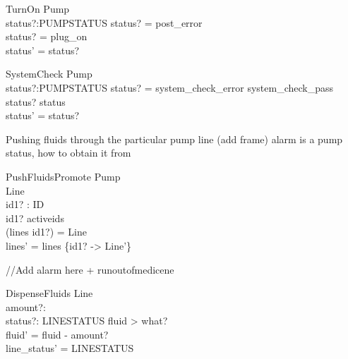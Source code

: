 \documentclass{article}
\begin{document}
	\begin{schema}{TurnOn}
		\Delta Pump \\
		status?:PUMPSTATUS
	\where 
		status? = post\_error  \\
		status? = plug\_on \\
		status' = status?
	\end{schema}
			
	\begin{schema}{SystemCheck}
		\Delta Pump\\
		status?:PUMPSTATUS
	\where 
		status? = system\_check\_error \lor system\_check\_pass \\
		status? \neq status\\
		status' = status?
	\end{schema}
	
	Pushing fluids through the particular pump line (add frame) alarm is a pump status, how to obtain it from
	
	\begin{schema}{PushFluidsPromote}
		\Delta Pump	\\
		\Delta Line \\
		id1? : ID \\
	\where 
		id1? \in activeids \\
		(lines id1?) = \theta Line \\
		lines' = lines \oplus \{id1? -> \theta Line'\} \\		
	\end{schema}
	
	//Add alarm here + runoutofmedicene
	\begin{schema}{DispenseFluids}
		\Delta Line \\
		amount?: \nat \\
		status?: LINESTATUS
	\where 
		fluid > what? \\
		fluid' = fluid - amount? \\
		line_status' = LINESTATUS
	\end{schema}
\end{document}
